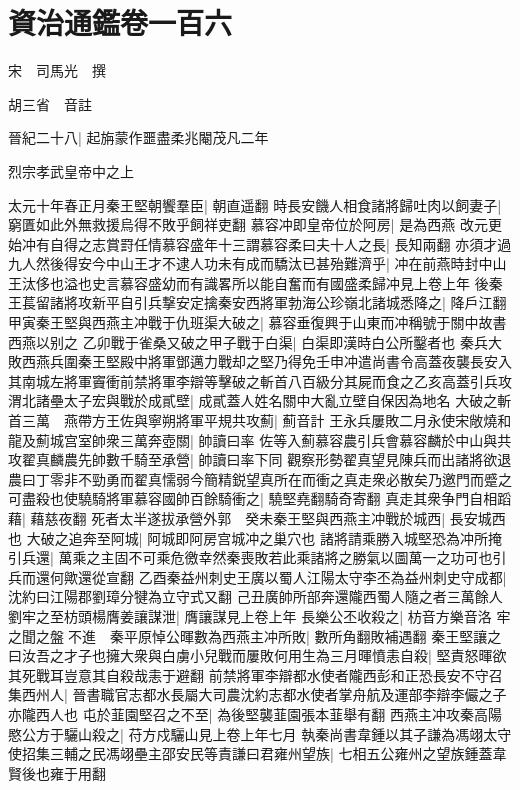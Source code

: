 \chapter{資治通鑑卷一百六}
宋　司馬光　撰

胡三省　音註

晉紀二十八|{
	起旃蒙作噩盡柔兆閹茂凡二年}


烈宗孝武皇帝中之上

太元十年春正月秦王堅朝饗羣臣|{
	朝直遥翻}
時長安饑人相食諸將歸吐肉以飼妻子|{
	窮匱如此外無救援烏得不敗乎飼祥吏翻}
慕容冲即皇帝位於阿房|{
	是為西燕}
改元更始冲有自得之志賞罸任情慕容盛年十三謂慕容柔曰夫十人之長|{
	長知兩翻}
亦須才過九人然後得安今中山王才不逮人功未有成而驕汰已甚殆難濟乎|{
	冲在前燕時封中山王汰侈也溢也史言慕容盛幼而有識畧所以能自奮而有國盛柔歸冲見上卷上年}
後秦王萇留諸將攻新平自引兵撃安定擒秦安西將軍勃海公珍嶺北諸城悉降之|{
	降戶江翻}
甲寅秦王堅與西燕主冲戰于仇班渠大破之|{
	慕容垂復興于山東而冲稱號于關中故書西燕以别之}
乙卯戰于雀桑又破之甲子戰于白渠|{
	白渠即漢時白公所鑿者也}
秦兵大敗西燕兵圍秦王堅殿中將軍鄧邁力戰却之堅乃得免壬申冲遣尚書令高蓋夜襲長安入其南城左將軍竇衝前禁將軍李辯等擊破之斬首八百級分其屍而食之乙亥高蓋引兵攻渭北諸壘太子宏與戰於成貳壁|{
	成貳蓋人姓名關中大亂立壁自保因為地名}
大破之斬首三萬　燕帶方王佐與寧朔將軍平規共攻薊|{
	薊音計}
王永兵屢敗二月永使宋敞燒和龍及薊城宫室帥衆三萬奔壺關|{
	帥讀曰率}
佐等入薊慕容農引兵會慕容麟於中山與共攻翟真麟農先帥數千騎至承營|{
	帥讀曰率下同}
觀察形勢翟真望見陳兵而出諸將欲退農曰丁零非不勁勇而翟真懦弱今簡精鋭望真所在而衝之真走衆必散矣乃邀門而蹙之可盡殺也使驍騎將軍慕容國帥百餘騎衝之|{
	驍堅堯翻騎奇寄翻}
真走其衆争門自相蹈藉|{
	藉慈夜翻}
死者太半遂拔承營外郭　癸未秦王堅與西燕主冲戰於城西|{
	長安城西也}
大破之追奔至阿城|{
	阿城即阿房宫城冲之巢穴也}
諸將請乘勝入城堅恐為冲所掩引兵還|{
	萬乘之主固不可乘危徼幸然秦喪敗若此乘諸將之勝氣以圖萬一之功可也引兵而還何歟還從宣翻}
乙酉秦益州刺史王廣以蜀人江陽太守李丕為益州刺史守成都|{
	沈約曰江陽郡劉璋分犍為立守式又翻}
己丑廣帥所部奔還隴西蜀人隨之者三萬餘人　劉牢之至枋頭楊膺姜讓謀泄|{
	膺讓謀見上卷上年}
長樂公丕收殺之|{
	枋音方樂音洛}
牢之聞之盤不進　秦平原悼公暉數為西燕主冲所敗|{
	數所角翻敗補遇翻}
秦王堅讓之曰汝吾之才子也擁大衆與白虜小兒戰而屢敗何用生為三月暉憤恚自殺|{
	堅責怒暉欲其死戰耳豈意其自殺哉恚于避翻}
前禁將軍李辯都水使者隴西彭和正恐長安不守召集西州人|{
	晉書職官志都水長屬大司農沈約志都水使者掌舟航及運部李辯李儼之子亦隴西人也}
屯於韮園堅召之不至|{
	為後堅襲韮園張本韮舉有翻}
西燕主冲攻秦高陽愍公方于驪山殺之|{
	苻方戍驪山見上卷上年七月}
執秦尚書韋鍾以其子謙為馮翊太守使招集三輔之民馮翊壘主邵安民等責謙曰君雍州望族|{
	七相五公雍州之望族鍾蓋韋賢後也雍于用翻}
